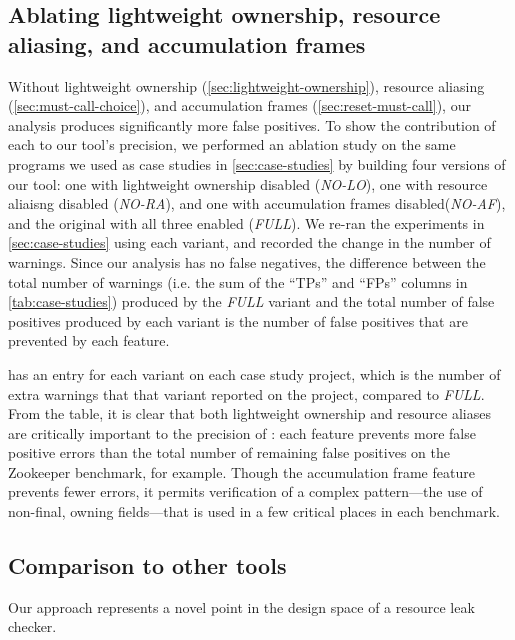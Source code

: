 \subsection{Ablating lightweight ownership, resource aliasing, and accumulation frames}
\label{sec:ablation}

Without lightweight ownership (\cref{sec:lightweight-ownership}),
resource aliasing (\cref{sec:must-call-choice}), and
accumulation frames (\cref{sec:reset-must-call}), our analysis produces significantly
more false positives. To show the contribution of each to our tool's precision,
we performed an ablation study on the same programs we used as case studies in
\cref{sec:case-studies} by building four versions of our tool:
one with lightweight ownership disabled (\emph{NO-LO}),
one with resource aliaisng disabled (\emph{NO-RA}),
and one with accumulation frames disabled(\emph{NO-AF}),
and the original with all three enabled (\emph{FULL}).
We re-ran the experiments in \cref{sec:case-studies} using each variant, and
recorded the change in the number of warnings. Since our analysis has no false
negatives, the difference between the total number of warnings (i.e. the sum of
the ``TPs'' and ``FPs'' columns in \cref{tab:case-studies}) produced by the \emph{FULL}
variant and the total number of false positives produced by each variant is
the number of false positives that are prevented by each feature.

 has an entry for each variant on each case study project,
which is the number of extra warnings that that variant reported on the project,
compared to \emph{FULL}. From the table, it is clear that both lightweight
ownership and resource aliases are critically important to the precision of
\tool: each feature prevents more false positive errors than the total number
of remaining false positives on the Zookeeper benchmark, for example.  Though
the accumulation frame feature prevents fewer errors, it permits verification
of a complex pattern---the use of non-final, owning fields---that is used in a
few critical places in each benchmark.

\subsection{Comparison to other tools}
\label{sec:compare}

Our approach represents a novel point in the design space of a resource leak checker.

